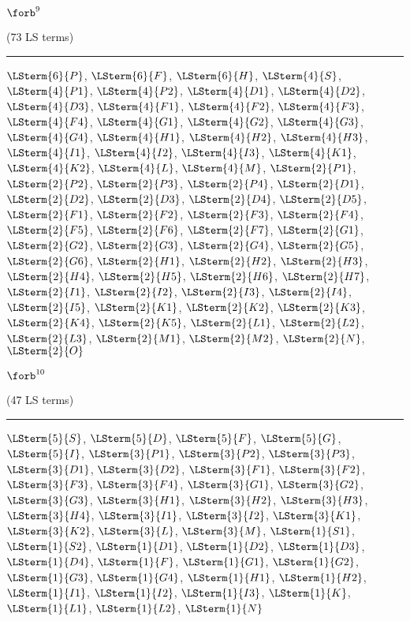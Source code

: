 \begin{mdframed}\begin{center}
$\forb^{9}$

(73 LS terms)
\vspace{0.25cm}\hrule\vspace{0.25cm}

$\LSterm{6}{P}$, $\LSterm{6}{F}$, $\LSterm{6}{H}$, $\LSterm{4}{S}$, $\LSterm{4}{P1}$, $\LSterm{4}{P2}$, $\LSterm{4}{D1}$, $\LSterm{4}{D2}$, $\LSterm{4}{D3}$, $\LSterm{4}{F1}$, $\LSterm{4}{F2}$, $\LSterm{4}{F3}$, $\LSterm{4}{F4}$, $\LSterm{4}{G1}$, $\LSterm{4}{G2}$, $\LSterm{4}{G3}$, $\LSterm{4}{G4}$, $\LSterm{4}{H1}$, $\LSterm{4}{H2}$, $\LSterm{4}{H3}$, $\LSterm{4}{I1}$, $\LSterm{4}{I2}$, $\LSterm{4}{I3}$, $\LSterm{4}{K1}$, $\LSterm{4}{K2}$, $\LSterm{4}{L}$, $\LSterm{4}{M}$, $\LSterm{2}{P1}$, $\LSterm{2}{P2}$, $\LSterm{2}{P3}$, $\LSterm{2}{P4}$, $\LSterm{2}{D1}$, $\LSterm{2}{D2}$, $\LSterm{2}{D3}$, $\LSterm{2}{D4}$, $\LSterm{2}{D5}$, $\LSterm{2}{F1}$, $\LSterm{2}{F2}$, $\LSterm{2}{F3}$, $\LSterm{2}{F4}$, $\LSterm{2}{F5}$, $\LSterm{2}{F6}$, $\LSterm{2}{F7}$, $\LSterm{2}{G1}$, $\LSterm{2}{G2}$, $\LSterm{2}{G3}$, $\LSterm{2}{G4}$, $\LSterm{2}{G5}$, $\LSterm{2}{G6}$, $\LSterm{2}{H1}$, $\LSterm{2}{H2}$, $\LSterm{2}{H3}$, $\LSterm{2}{H4}$, $\LSterm{2}{H5}$, $\LSterm{2}{H6}$, $\LSterm{2}{H7}$, $\LSterm{2}{I1}$, $\LSterm{2}{I2}$, $\LSterm{2}{I3}$, $\LSterm{2}{I4}$, $\LSterm{2}{I5}$, $\LSterm{2}{K1}$, $\LSterm{2}{K2}$, $\LSterm{2}{K3}$, $\LSterm{2}{K4}$, $\LSterm{2}{K5}$, $\LSterm{2}{L1}$, $\LSterm{2}{L2}$, $\LSterm{2}{L3}$, $\LSterm{2}{M1}$, $\LSterm{2}{M2}$, $\LSterm{2}{N}$, $\LSterm{2}{O}$
\end{center}\end{mdframed}

\begin{mdframed}\begin{center}
$\forb^{10}$

(47 LS terms)
\vspace{0.25cm}\hrule\vspace{0.25cm}

$\LSterm{5}{S}$, $\LSterm{5}{D}$, $\LSterm{5}{F}$, $\LSterm{5}{G}$, $\LSterm{5}{I}$, $\LSterm{3}{P1}$, $\LSterm{3}{P2}$, $\LSterm{3}{P3}$, $\LSterm{3}{D1}$, $\LSterm{3}{D2}$, $\LSterm{3}{F1}$, $\LSterm{3}{F2}$, $\LSterm{3}{F3}$, $\LSterm{3}{F4}$, $\LSterm{3}{G1}$, $\LSterm{3}{G2}$, $\LSterm{3}{G3}$, $\LSterm{3}{H1}$, $\LSterm{3}{H2}$, $\LSterm{3}{H3}$, $\LSterm{3}{H4}$, $\LSterm{3}{I1}$, $\LSterm{3}{I2}$, $\LSterm{3}{K1}$, $\LSterm{3}{K2}$, $\LSterm{3}{L}$, $\LSterm{3}{M}$, $\LSterm{1}{S1}$, $\LSterm{1}{S2}$, $\LSterm{1}{D1}$, $\LSterm{1}{D2}$, $\LSterm{1}{D3}$, $\LSterm{1}{D4}$, $\LSterm{1}{F}$, $\LSterm{1}{G1}$, $\LSterm{1}{G2}$, $\LSterm{1}{G3}$, $\LSterm{1}{G4}$, $\LSterm{1}{H1}$, $\LSterm{1}{H2}$, $\LSterm{1}{I1}$, $\LSterm{1}{I2}$, $\LSterm{1}{I3}$, $\LSterm{1}{K}$, $\LSterm{1}{L1}$, $\LSterm{1}{L2}$, $\LSterm{1}{N}$
\end{center}\end{mdframed}

